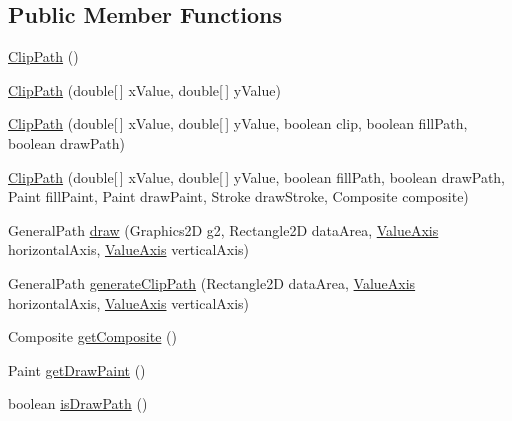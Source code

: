 \subsection*{Public Member Functions}
\begin{DoxyCompactItemize}
\item 
\mbox{\hyperlink{classorg_1_1jfree_1_1chart_1_1_clip_path_a1b1d732b206663a189a5941af816c89c}{Clip\+Path}} ()
\item 
\mbox{\hyperlink{classorg_1_1jfree_1_1chart_1_1_clip_path_ab29d997fea052d7f2c7bb8af27e0fbaa}{Clip\+Path}} (double\mbox{[}$\,$\mbox{]} x\+Value, double\mbox{[}$\,$\mbox{]} y\+Value)
\item 
\mbox{\hyperlink{classorg_1_1jfree_1_1chart_1_1_clip_path_a81cb5c0f92d313e2a0754c300260f070}{Clip\+Path}} (double\mbox{[}$\,$\mbox{]} x\+Value, double\mbox{[}$\,$\mbox{]} y\+Value, boolean clip, boolean fill\+Path, boolean draw\+Path)
\item 
\mbox{\hyperlink{classorg_1_1jfree_1_1chart_1_1_clip_path_a7121caf5e88742ceb3b2cd7c7ed31635}{Clip\+Path}} (double\mbox{[}$\,$\mbox{]} x\+Value, double\mbox{[}$\,$\mbox{]} y\+Value, boolean fill\+Path, boolean draw\+Path, Paint fill\+Paint, Paint draw\+Paint, Stroke draw\+Stroke, Composite composite)
\item 
General\+Path \mbox{\hyperlink{classorg_1_1jfree_1_1chart_1_1_clip_path_a65e7d7612f1795b39b06049aaa59613c}{draw}} (Graphics2D g2, Rectangle2D data\+Area, \mbox{\hyperlink{classorg_1_1jfree_1_1chart_1_1axis_1_1_value_axis}{Value\+Axis}} horizontal\+Axis, \mbox{\hyperlink{classorg_1_1jfree_1_1chart_1_1axis_1_1_value_axis}{Value\+Axis}} vertical\+Axis)
\item 
General\+Path \mbox{\hyperlink{classorg_1_1jfree_1_1chart_1_1_clip_path_a9c71f5823f4f0f07c589bb6aced3807f}{generate\+Clip\+Path}} (Rectangle2D data\+Area, \mbox{\hyperlink{classorg_1_1jfree_1_1chart_1_1axis_1_1_value_axis}{Value\+Axis}} horizontal\+Axis, \mbox{\hyperlink{classorg_1_1jfree_1_1chart_1_1axis_1_1_value_axis}{Value\+Axis}} vertical\+Axis)
\item 
Composite \mbox{\hyperlink{classorg_1_1jfree_1_1chart_1_1_clip_path_afaed4fd91a67061ff4cd766127eedc38}{get\+Composite}} ()
\item 
Paint \mbox{\hyperlink{classorg_1_1jfree_1_1chart_1_1_clip_path_a77b37d07db4a0f025ff038f01b3719d3}{get\+Draw\+Paint}} ()
\item 
boolean \mbox{\hyperlink{classorg_1_1jfree_1_1chart_1_1_clip_path_a59978209465e3a6befe785fb2f55f90e}{is\+Draw\+Path}} ()
\item 

\end{DoxyCompactItemize}
